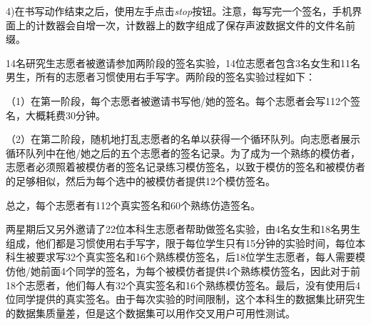 4)在书写动作结束之后，使用左手点击\textit{stop}按钮。注意，每写完一个签名，手机界面上的计数器会自增一次，计数器上的数字组成了保存声波数据文件的文件名前缀。

14名研究生志愿者被邀请参加两阶段的签名实验，14位志愿者包含3名女生和11名男生，所有的志愿者习惯使用右手写字。两阶段的签名实验过程如下：

（1）在第一阶段，每个志愿者被邀请书写他/她的签名。每个志愿者会写112个签名，大概耗费30分钟。

（2）在第二阶段，随机地打乱志愿者的名单以获得一个循环队列。向志愿者展示循环队列中在他/她之后的五个志愿者的签名记录。为了成为一个熟练的模仿者，志愿者必须照着被模仿者的签名记录练习模仿签名，以致于模仿的签名和被模仿者的足够相似，然后为每个选中的被模仿者提供12个模仿签名。

总之，每个志愿者有112个真实签名和60个熟练仿造签名。

两星期后又另外邀请了22位本科生志愿者帮助做签名实验，由4名女生和18名男生组成，他们都是习惯使用右手写字，限于每位学生只有15分钟的实验时间，每位本科生被要求写32个真实签名和16个熟练模仿签名，后18位学生志愿者，每人需要模仿他/她前面4个同学的签名，为每个被模仿者提供4个熟练模仿签名，因此对于前18个志愿者，他们每人有32个真实签名和16个熟练模仿签名。最后，没有使用后4位同学提供的真实签名。由于每次实验的时间限制，这个本科生的数据集比研究生的数据集质量差，但是这个数据集可以用作交叉用户可用性测试。

